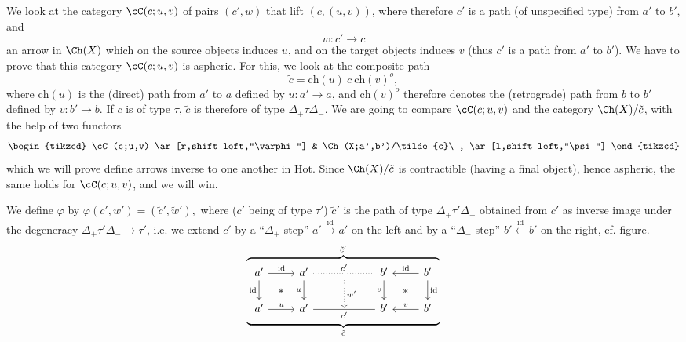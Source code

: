 We look at the category $\cC(c;u,v)$ of pairs $(c',w)$ that lift $(c,(u,v))$, where therefore $c'$ is a path (of unspecified type) from $a'$ to $b'$, and
\[
w : c' \longrightarrow c
\]
an arrow in $\Ch(X)$ which on the source objects induces $u$, and on the target objects induces $v$ (thus $c'$ is a path from $a'$ to $b'$). We have to
prove that this category $\cC(c;u,v)$ is aspheric. For this, we look at the composite path
\[
\tilde{c} = \mathrm{ch}(u)\ c\ \mathrm{ch}(v)^{o},
\]
where $\mathrm{ch}(u)$ is the (direct) path from $a'$ to $a$ defined by $u : a' \longrightarrow a$, and $\mathrm{ch}(v)^{o}$ therefore denotes the (retrograde) path from $b$ to $b'$ defined by $v : b' \longrightarrow b$. If $c$ is of type $\tau$, $\tilde{c}$ is therefore of type $\Delta_{+}\tau\Delta_{-}$. We are going to compare $\cC(c;u,v)$ and the category $\Ch(X)/\tilde{c}$, with the help of two functors
\[
\begin{tikzcd}
\cC(c;u,v) \ar[r,shift left,"\varphi"] & \Ch(X;a',b')/\tilde{c}\ , \ar[l,shift left,"\psi"]
\end{tikzcd}
\]
which we will prove define arrows inverse to one another in Hot. Since $\Ch(X)/\tilde{c}$ is contractible (having a final object), hence aspheric, the same holds for $\cC(c;u,v)$, and we will win.

We define $\varphi$ by $\boxed{\varphi(c',w') = (\tilde{c}',\tilde{w}'),}$ where ($c'$ being of type $\tau'$) $\tilde{c}'$ is the path of type $\Delta_{+}\tau'\Delta_{-}$ obtained from $c'$ as inverse image under the degeneracy $\Delta_{+}\tau'\Delta_{-} \longrightarrow \tau'$, i.e. we extend $c'$ by a ``$\Delta_{+}$ step'' $a' \xrightarrow{\mathrm{id}} a'$ on the left and by a ``$\Delta_{-}$ step'' $b' \xleftarrow{\mathrm{id}} b'$ on the right, cf. figure.
\[
\overbrace{\underbrace{\begin{tikzcd}[ampersand replacement=\&]
a' \ar[r,"\mathrm{id}"] \ar[d,"\mathrm{id}"'] \ar[dr,phantom,"\ast"] \& a' \ar[rr,dotted,no head,"c'"] \ar[d,"u"'] \& {} \ar[d,dotted,"w'"] \& b' \ar[d,"v"'] \ar[dr,phantom,"\ast"] \& b' \ar[l,"\mathrm{id}"'] \ar[d,"\mathrm{id}"] \\
a' \ar[r,"u"] \& a' \ar[rr,no head,"c'"'] \& {} \& b' \& b' \ar[l,"v"'] %
\end{tikzcd}}_{\tilde{c}}}^{\tilde{c}'}
\]

